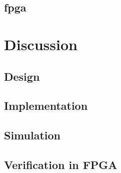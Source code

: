 \documentclass{report}
\begin{document}
\section{fpga}


\newpage
\chapter{Discussion}
\section{Design}


\section{Implementation}


\section{Simulation}


\section{Verification in FPGA}


\newpage
\end{document}
